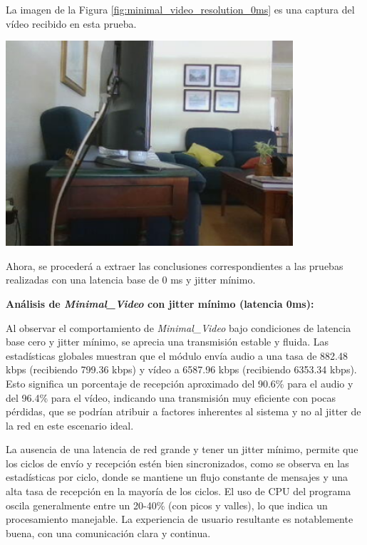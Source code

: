 \newpage
La imagen de la Figura \ref{fig:minimal_video_resolution_0ms} es una captura del vídeo recibido en esta prueba.
\begin{center}
  \includegraphics[width = 0.8\textwidth]{images/VideoRecibido4.3.png}
  \label{fig:minimal_video_resolution_0ms}
\end{center}

\newpage

Ahora, se procederá a extraer las conclusiones correspondientes a las pruebas realizadas con una latencia base de 0 ms y jitter mínimo.
\vspace{\baselineskip}

\textbf{Análisis de \textit{Minimal\_Video} con jitter mínimo (latencia 0ms):}
\vspace{\baselineskip}

Al observar el comportamiento de \textit{Minimal\_Video} bajo condiciones de latencia base cero y jitter mínimo, se aprecia una transmisión estable y fluida. Las estadísticas globales muestran que el módulo envía audio a una tasa de 882.48 kbps (recibiendo 799.36 kbps) y vídeo a 6587.96 kbps (recibiendo 6353.34 kbps). Esto significa un porcentaje de recepción aproximado del 90.6\% para el audio y del 96.4\% para el vídeo, indicando una transmisión muy eficiente con pocas pérdidas, que se podrían atribuir a factores inherentes al sistema y no al jitter de la red en este escenario ideal.
\vspace{\baselineskip}

La ausencia de una latencia de red grande y tener un jitter mínimo, permite que los ciclos de envío y recepción estén bien sincronizados, como se observa en las estadísticas por ciclo, donde se mantiene un flujo constante de mensajes y una alta tasa de recepción en la mayoría de los ciclos. El uso de CPU del programa oscila generalmente entre un 20-40\% (con picos y valles), lo que indica un procesamiento manejable. La experiencia de usuario resultante es notablemente buena, con una comunicación clara y continua.

